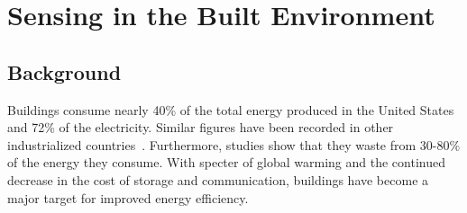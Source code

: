 \chapter{Sensing in the Built Environment}







\section{Background}
Buildings consume nearly 40\% of the total energy produced in the United States and 72\% of the electricity.  Similar figures 
have been recorded in other industrialized countries~\cite{buildings_study}.  Furthermore, studies show that they waste from
30-80\% of the energy they consume.  With specter of global warming and the continued decrease in the cost of storage and 
communication, buildings have become a major target for improved energy efficiency.


